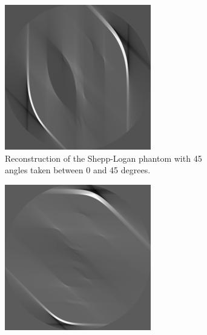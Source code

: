 \begin{figure}
	\centering
	\begin{subfigure}{0.48\linewidth}
		\centering
		\includegraphics[width=\linewidth]{Materials/lin1}
		\caption{Reconstruction of the Shepp-Logan phantom with 45 angles taken between 0 and 45 degrees.}
	\end{subfigure}
	\hfill
	\begin{subfigure}{0.48\linewidth}
		\centering
		\includegraphics[width=\linewidth]{Materials/lin2}

\end{subfigure}
\end{figure}
